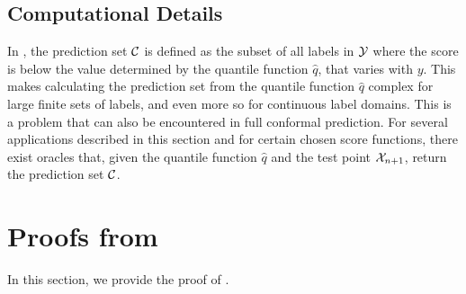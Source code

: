 \subsection{Computational Details}
\label{sec: computation}
In , the prediction set ${\cal C}$ is defined as the subset of all labels in ${\cal Y}$ where the score is below the value determined by the quantile function $\hat q$, that varies with $y$. This makes calculating the prediction set from the quantile function $\hat q$ complex for large finite sets of labels, and even more so for continuous label domains. This is a problem that can also be encountered in full conformal prediction. For several applications described in this section and for certain chosen score functions, there exist oracles that, given the quantile function $\hat q$ and the test point ${\cal X}_{n+1}$, return the prediction set ${\cal C}$.



\section{Proofs from  }
In this section, we provide the proof of .

